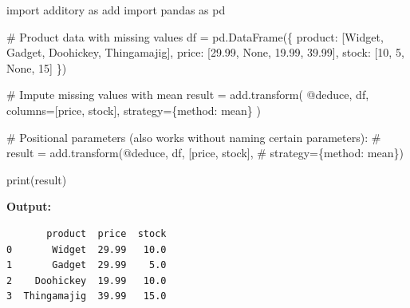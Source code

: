 \documentclass[
  letterpaper,
]{scrbook}
\newenvironment{Shaded}{\begin{snugshade}}{\end{snugshade}}
\newcommand{\BuiltInTok}[1]{\textcolor[rgb]{0.00,0.23,0.31}{#1}}
\newcommand{\CommentTok}[1]{\textcolor[rgb]{0.37,0.37,0.37}{#1}}
\newcommand{\DecValTok}[1]{\textcolor[rgb]{0.68,0.00,0.00}{#1}}
\newcommand{\FloatTok}[1]{\textcolor[rgb]{0.68,0.00,0.00}{#1}}
\newcommand{\ImportTok}[1]{\textcolor[rgb]{0.00,0.46,0.62}{#1}}
\newcommand{\NormalTok}[1]{\textcolor[rgb]{0.00,0.23,0.31}{#1}}
\newcommand{\OperatorTok}[1]{\textcolor[rgb]{0.37,0.37,0.37}{#1}}
\newcommand{\StringTok}[1]{\textcolor[rgb]{0.13,0.47,0.30}{#1}}
\newcommand{\VariableTok}[1]{\textcolor[rgb]{0.07,0.07,0.07}{#1}}
\begin{document}
\begin{Shaded}
\begin{Highlighting}[]
\ImportTok{import}\NormalTok{ additory }\ImportTok{as}\NormalTok{ add}
\ImportTok{import}\NormalTok{ pandas }\ImportTok{as}\NormalTok{ pd}

\CommentTok{\# Product data with missing values}
\NormalTok{df }\OperatorTok{=}\NormalTok{ pd.DataFrame(\{}
    \StringTok{\textquotesingle{}product\textquotesingle{}}\NormalTok{: [}\StringTok{\textquotesingle{}Widget\textquotesingle{}}\NormalTok{, }\StringTok{\textquotesingle{}Gadget\textquotesingle{}}\NormalTok{, }\StringTok{\textquotesingle{}Doohickey\textquotesingle{}}\NormalTok{, }\StringTok{\textquotesingle{}Thingamajig\textquotesingle{}}\NormalTok{],}
    \StringTok{\textquotesingle{}price\textquotesingle{}}\NormalTok{: [}\FloatTok{29.99}\NormalTok{, }\VariableTok{None}\NormalTok{, }\FloatTok{19.99}\NormalTok{, }\FloatTok{39.99}\NormalTok{],}
    \StringTok{\textquotesingle{}stock\textquotesingle{}}\NormalTok{: [}\DecValTok{10}\NormalTok{, }\DecValTok{5}\NormalTok{, }\VariableTok{None}\NormalTok{, }\DecValTok{15}\NormalTok{]}
\NormalTok{\})}

\CommentTok{\# Impute missing values with mean}
\NormalTok{result }\OperatorTok{=}\NormalTok{ add.transform(}
    \StringTok{\textquotesingle{}@deduce\textquotesingle{}}\NormalTok{,}
\NormalTok{    df,}
\NormalTok{    columns}\OperatorTok{=}\NormalTok{[}\StringTok{\textquotesingle{}price\textquotesingle{}}\NormalTok{, }\StringTok{\textquotesingle{}stock\textquotesingle{}}\NormalTok{],}
\NormalTok{    strategy}\OperatorTok{=}\NormalTok{\{}\StringTok{\textquotesingle{}method\textquotesingle{}}\NormalTok{: }\StringTok{\textquotesingle{}mean\textquotesingle{}}\NormalTok{\}}
\NormalTok{)}

\CommentTok{\# Positional parameters (also works without naming certain parameters):}
\CommentTok{\# result = add.transform(\textquotesingle{}@deduce\textquotesingle{}, df, [\textquotesingle{}price\textquotesingle{}, \textquotesingle{}stock\textquotesingle{}], }
\CommentTok{\#                        strategy=\{\textquotesingle{}method\textquotesingle{}: \textquotesingle{}mean\textquotesingle{}\})}

\BuiltInTok{print}\NormalTok{(result)}
\end{Highlighting}
\end{Shaded}

\textbf{Output:}

\begin{verbatim}
       product  price  stock
0       Widget  29.99   10.0
1       Gadget  29.99    5.0
2    Doohickey  19.99   10.0
3  Thingamajig  39.99   15.0
\end{verbatim}
\end{document}
